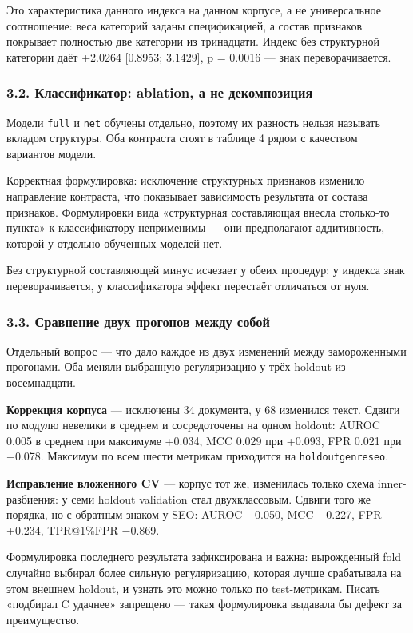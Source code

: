 \documentclass[11pt,a4paper]{article}
\renewcommand{\_}{\textunderscore\allowbreak}
\begin{document}
Это характеристика данного индекса на данном корпусе, а не универсальное
соотношение: веса категорий заданы спецификацией, а состав признаков покрывает
полностью две категории из тринадцати. Индекс без структурной категории даёт
+2.0264 [0.8953; 3.1429], p = 0.0016 — знак переворачивается.

\subsubsection{3.2. Классификатор: ablation, а не декомпозиция}

Модели \texttt{full} и \texttt{net} обучены отдельно, поэтому их разность нельзя называть
вкладом структуры. Оба контраста стоят в таблице 4 рядом с качеством вариантов
модели.

\setcounter{table}{3}


Корректная формулировка: исключение структурных признаков изменило направление
контраста, что показывает зависимость результата от состава признаков.
Формулировки вида «структурная составляющая внесла столько-то пункта» к
классификатору неприменимы — они предполагают аддитивность, которой у отдельно
обученных моделей нет.

Без структурной составляющей минус исчезает у обеих процедур: у индекса знак
переворачивается, у классификатора эффект перестаёт отличаться от нуля.

\subsubsection{3.3. Сравнение двух прогонов между собой}

Отдельный вопрос — что дало каждое из двух изменений между замороженными
прогонами. Оба меняли выбранную регуляризацию у трёх holdout из восемнадцати.

\textbf{Коррекция корпуса} — исключены 34 документа, у 68 изменился текст. Сдвиги по
модулю невелики в среднем и сосредоточены на одном holdout: AUROC 0.005 в среднем
при максимуме +0.034, MCC 0.029 при +0.093, FPR 0.021 при $-$0.078. Максимум по
всем шести метрикам приходится на \texttt{holdout\_genre\_seo}.

\textbf{Исправление вложенного CV} — корпус тот же, изменилась только схема
inner-разбиения: у семи holdout validation стал двухклассовым. Сдвиги того же
порядка, но с обратным знаком у SEO: AUROC $-$0.050, MCC $-$0.227, FPR +0.234,
TPR@1\%FPR $-$0.869.

Формулировка последнего результата зафиксирована и важна: вырожденный fold
случайно выбирал более сильную регуляризацию, которая лучше срабатывала на этом
внешнем holdout, и узнать это можно только по test-метрикам. Писать «подбирал C
удачнее» запрещено — такая формулировка выдавала бы дефект за преимущество.
\end{document}

